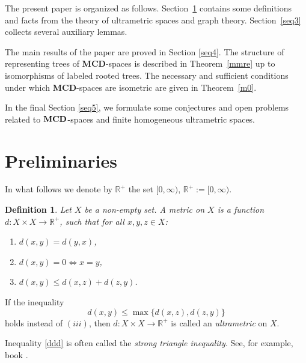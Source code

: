 \documentclass{raex}
\newtheorem{defn}[thm]{Definition}
\theoremstyle{definition}
\theoremstyle{remark}
\numberwithin{equation}{section}
\begin{document}
The present paper is organized as follows. Section~\ref{seq2} contains some definitions and facts from the theory of ultrametric spaces and graph theory. Section~\ref{seq3} collects several auxiliary lemmas.

The main results of the paper are proved in Section \ref{seq4}.
The structure of representing trees of {\bf MCD}-spaces is described in Theorem~\ref{mmre} up to isomorphisms of labeled rooted trees. The necessary and sufficient conditions under which {\bf MCD}-spaces are isometric are given in Theorem~\ref{m0}. 


In the final Section \ref{seq5}, we formulate some conjectures and open problems related to ${\bf MCD}$-spaces and finite homogeneous ultrametric spaces.



\section{Preliminaries}\label{seq2}


 In what follows we denote by $\mathbb{R}^{+}$ the set $[0,\infty)$,
\(
\mathbb{R}^{+}:=[0,\infty).
\)








\begin{defn}\label{ganb}
Let $X$ be a non-empty set. A {\it metric} on  $X$ is a function $d : X \times X \to \mathbb{R}^+$,  such that for all $x,y,z \in X$:
\begin{enumerate}
\item[{\it(i)}] $d(x,y)=d(y,x)$,
\item[{\it(ii)}]  $d(x,y)=0 \iff x=y$,
\item[{\it(iii)}]  $d(x,y)\le d(x,z)+d(z,y)$.
\end{enumerate}
\end{defn}


If the inequality
\begin{equation}
    \label{ddd}
d(x,y)\le \max \{d(x,z),d(z,y)\}
\end{equation}
holds instead of $(iii)$, then $d : X \times X \to \mathbb{R}^+$ is called an {\it ultrametric} on $X$.



Inequality \eqref{ddd} is often called the {\it strong triangle inequality}. See, for example, book \cite[p. 40]{Surinder}.
\end{document}
